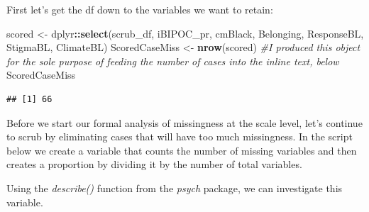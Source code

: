 \documentclass[
  11pt,
]{book}
\newenvironment{Shaded}{\begin{snugshade}}{\end{snugshade}}
\newcommand{\AttributeTok}[1]{\textcolor[rgb]{0.27,0.27,0.27}{#1}}
\newcommand{\CommentTok}[1]{\textcolor[rgb]{0.37,0.37,0.37}{\textit{#1}}}
\newcommand{\DecValTok}[1]{\textcolor[rgb]{0.06,0.06,0.06}{#1}}
\newcommand{\FunctionTok}[1]{\textcolor[rgb]{0.27,0.27,0.27}{\textbf{#1}}}
\newcommand{\NormalTok}[1]{#1}
\newcommand{\OtherTok}[1]{\textcolor[rgb]{0.37,0.37,0.37}{#1}}
\newcommand{\SpecialCharTok}[1]{\textcolor[rgb]{0.43,0.43,0.43}{\textbf{#1}}}
\begin{document}
First let's get the df down to the variables we want to retain:

\begin{Shaded}
\begin{Highlighting}[]
\NormalTok{scored }\OtherTok{\textless{}{-}}\NormalTok{ dplyr}\SpecialCharTok{::}\FunctionTok{select}\NormalTok{(scrub\_df, iBIPOC\_pr, cmBlack, Belonging, ResponseBL,}
\NormalTok{    StigmaBL, ClimateBL)}
\NormalTok{ScoredCaseMiss }\OtherTok{\textless{}{-}} \FunctionTok{nrow}\NormalTok{(scored)  }\CommentTok{\#I produced this object for the sole purpose of feeding the number of cases into the inline text, below}
\NormalTok{ScoredCaseMiss}
\end{Highlighting}
\end{Shaded}

\begin{verbatim}
## [1] 66
\end{verbatim}

Before we start our formal analysis of missingness at the scale level, let's continue to scrub by eliminating cases that will have too much missingness. In the script below we create a variable that counts the number of missing variables and then creates a proportion by dividing it by the number of total variables.

Using the \emph{describe()} function from the \emph{psych} package, we can investigate this variable.

\begin{Shaded}
\end{Shaded}
\end{document}
